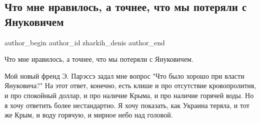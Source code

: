  
 
 
 
 
 
\subsection{Что мне нравилось, а точнее, что мы потеряли с Януковичем}
\label{sec:31_08_2014.fb.zharkih_denis.3.strana_janukovich}
 
\ifcmt
 author_begin
   author_id zharkih_denis
 author_end
\fi

Что мне нравилось, а точнее, что мы потеряли с Януковичем. 

Мой новый  френд Э. Парэссэ задал мне вопрос "Что было хорошо при власти
Януковича?" На этот ответ, конечно, есть клише и про отсутствие кровопролития,
и про спокойный доллар, и про наличие Крыма, и про наличие горячей воды. Но я
хочу ответить более нестандартно. Я хочу показать, как Украина теряла, и тот же
Крым, и воду горячую, и мирное небо над головой.

